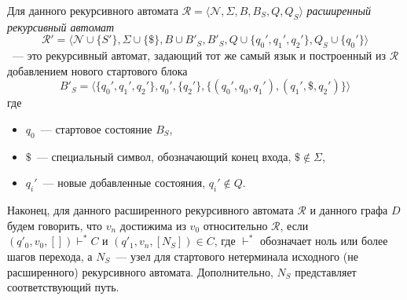\begin{definition}
    Для данного рекурсивного автомата $\mathcal{R}=\langle \mathcal{N},\Sigma,B,B_S,Q,Q_S\rangle$
    \textit{расширенный рекурсивный автомат}
    $$\mathcal{R}'=\langle \mathcal{N} \cup \{S'\},\Sigma \cup\{\$\},B \cup {B'_S},B'_S,Q \cup \{q_0',q_1',q_2'\},Q_S \cup \{q_0'\}\rangle$$
    ~--- это рекурсивный автомат, задающий тот же самый язык и построенный из $\mathcal{R}$ добавлением нового стартового блока
    $$B'_S = \langle \{q_0',q_1',q_2'\}, q_0', \{q_2'\}, \{(q_0',q_0,q_1'),(q_1',\$, q_2')\} \rangle$$ где
    \begin{itemize}
        \item $q_0$~--- стартовое состояние $B_S$,
        \item $\$$~--- специальный символ, обозначающий конец входа, $\$ \notin \Sigma$,
        \item $q_i'$~--- новые добавленные состояния, $q_i'\notin Q$.
    \end{itemize}
\end{definition}

Наконец, для данного расширенного рекурсивного автомата $\mathcal{R}$ и данного графа $D$ будем говорить, что $v_n$ достижима из $v_0$ относительно $\mathcal{R}$, если $(q'_0,v_0,[]) \vdash^* C$ и $(q'_1,v_n,[N_S]) \in C$, где $\vdash^*$ обозначает ноль или более шагов перехода, а $N_S$~--- узел для стартового нетерминала исходного (не расширенного) рекурсивного автомата. Дополнительно, $N_S$ представляет соответствующий путь.

